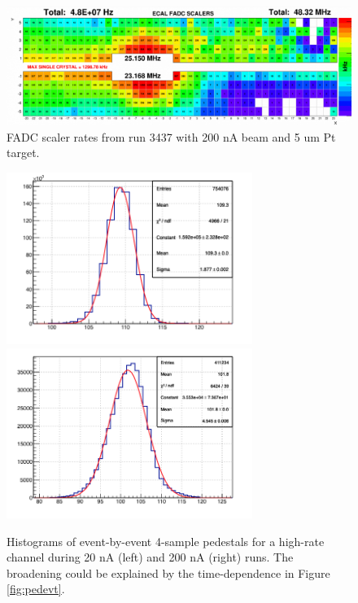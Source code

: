 \documentclass[amsmath,amssymb,notitlepage,12pt]{revtex4-1}
\begin{document}
\begin{figure}[htbp]\centering
    \includegraphics[width=17cm]{pics/rates.png}
    \caption{FADC scaler rates from run 3437 with 200 nA beam and 5 um Pt target.\label{fig:rates}}
\end{figure}

\begin{figure}[htbp]\centering
    \includegraphics[width=8cm]{pics/20nA.png}
    \includegraphics[width=8cm]{pics/200nA.png}
    \caption{Histograms of event-by-event 4-sample pedestals for a high-rate channel during 20 nA (left) and 200 nA (right) runs.  The broadening could be explained by the time-dependence in Figure \ref{fig:pedevt}.\label{fig:pedwidthhi}}
\end{figure}
\end{document}
